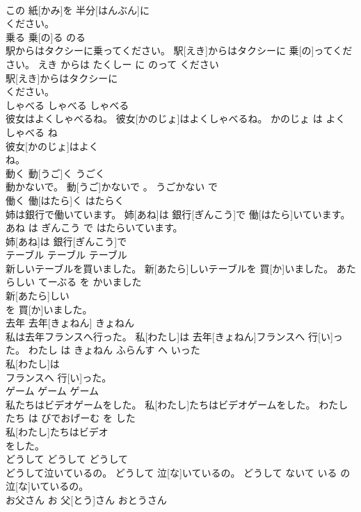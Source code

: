 \documentclass[8pt]{extreport}
\begin{document}
\begin{CJK}{UTF8}{min}
\\	この 紙[かみ]を 半分[はんぶん]に
\\	ください。			
\\	乗る	乗[の]る	のる	
\\	駅からはタクシーに乗ってください。	駅[えき]からはタクシーに 乗[の]ってください。	えき からは たくしー に のって ください	
\\	駅[えき]からはタクシーに
\\	ください。			
\\	しゃべる	しゃべる	しゃべる	
\\	彼女はよくしゃべるね。	彼女[かのじょ]はよくしゃべるね。	かのじょ は よく しゃべる ね	
\\	彼女[かのじょ]はよく
\\	ね。			
\\	動く	動[うご]く	うごく	
\\	動かないで。	動[うご]かないで 。	うごかない で	
\\	働く	働[はたら]く	はたらく	
\\	姉は銀行で働いています。	姉[あね]は 銀行[ぎんこう]で 働[はたら]いています。	あね は ぎんこう で はたらいています。	
\\	姉[あね]は 銀行[ぎんこう]で
\\	テーブル	テーブル	テーブル	
\\	新しいテーブルを買いました。	新[あたら]しいテーブルを 買[か]いました。	あたらしい てーぶる を かいました	
\\	新[あたら]しい
\\	を 買[か]いました。			
\\	去年	去年[きょねん]	きょねん	
\\	私は去年フランスへ行った。	私[わたし]は 去年[きょねん]フランスへ 行[い]った。	わたし は きょねん ふらんす へ いった	
\\	私[わたし]は
\\	フランスへ 行[い]った。			
\\	ゲーム	ゲーム	ゲーム	
\\	私たちはビデオゲームをした。	私[わたし]たちはビデオゲームをした。	わたしたち は びでおげーむ を した	
\\	私[わたし]たちはビデオ
\\	をした。			
\\	どうして	どうして	どうして	
\\	どうして泣いているの。	どうして 泣[な]いているの。	どうして ないて いる の	
\\	泣[な]いているの。			
\\	お父さん	お 父[とう]さん	おとうさん	

\end{CJK}
\end{document}
